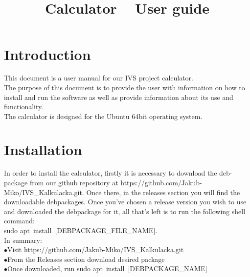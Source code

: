 \documentclass{article}
\title{Calculator -- User guide}
\date{}
\begin{document}
	\maketitle
	
	\tableofcontents
	
	\newpage
	
\section{Introduction}
	This document is a user manual for our IVS project calculator.\\
	The purpose of this document is to provide the user with information on how to install and run the software as well as provide information about its use and functionality.\\
	The calculator is designed for the Ubuntu 64bit operating system.
	\newpage
	
\section{Installation}
	In order to install the calculator, firstly it is necessary to download the deb-package from our github repository at https://github.com/Jakub-Miko/IVS\_Kalkulacka.git. Once there, in the releases section you will find the downloadable debpackages. Once you've chosen a release version you wish to use and downloaded the debpackage for it, all that's left is to run the following shell command: \\sudo apt\ install\ [DEBPACKAGE\_FILE\_NAME].\\
	In summary:\\
	$\bullet$Visit https://github.com/Jakub-Miko/IVS\_Kalkulacka.git\\
	$\bullet$From the Releases section download desired package\\
	$\bullet$Once downloaded, run sudo apt\ install\ [DEBPACKAGE\_NAME]
	\newpage
	
\end{document}
